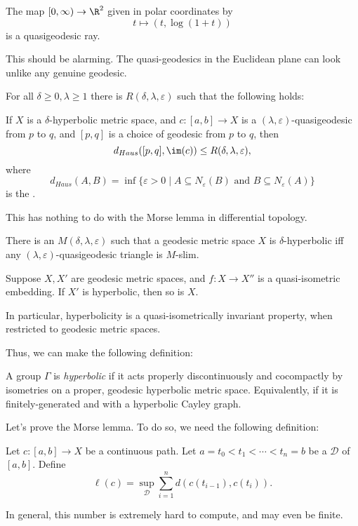 \documentclass[a4paper]{article}
\begin{document}
\begin{eg}
  The map $[0, \infty) \to \R^2$ given in polar coordinates by
  \[
    t \mapsto (t, \log(1 + t))
  \]
  is a quasigeodesic ray.
\end{eg}
This should be alarming. The quasi-geodesics in the Euclidean plane can look unlike any genuine geodesic.

\begin{thm}
  For all $\delta \geq 0, \lambda \geq 1$ there is $R(\delta, \lambda, \varepsilon)$ such that the following holds:
  
  If $X$ is a $\delta$-hyperbolic metric space, and $c: [a, b] \to X$ is a $(\lambda, \varepsilon)$-quasigeodesic from $p$ to $q$, and $[p, q]$ is a choice of geodesic from $p$ to $q$, then
  \[
    d_{Haus}([p, q], \im(c)) \leq R(\delta, \lambda, \varepsilon),
  \]
  where
  \[
    d_{Haus}(A, B) = \inf\{\varepsilon > 0 \mid A \subseteq N_\varepsilon(B) \text{ and }B \subseteq N_\varepsilon(A)\}
  \]
  is the .
\end{thm}
This has nothing to do with the Morse lemma in differential topology.

\begin{cor}
  There is an $M(\delta, \lambda, \varepsilon)$ such that a geodesic metric space $X$ is $\delta$-hyperbolic iff any $(\lambda, \varepsilon)$-quasigeodesic triangle is $M$-slim.
\end{cor}

\begin{cor}
  Suppose $X, X'$ are geodesic metric spaces, and $f: X \to X''$ is a quasi-isometric embedding. If $X'$ is hyperbolic, then so is $X$.

  In particular, hyperbolicity is a quasi-isometrically invariant property, when restricted to geodesic metric spaces.
\end{cor}

Thus, we can make the following definition:
\begin{defi}
  A  group $\Gamma$ is \emph{hyperbolic} if it acts properly discontinuously and cocompactly by isometries on a proper, geodesic hyperbolic metric space. Equivalently, if it is finitely-generated and with a hyperbolic Cayley graph.
\end{defi}

Let's prove the Morse lemma. To do so, we need the following definition:
\begin{defi}
  Let $c: [a, b] \to X$ be a continuous path. Let $a = t_0 < t_1 < \cdots < t_n = b$ be a  $\mathcal{D}$ of $[a, b]$. Define
  \[
    \ell (c) = \sup_{\mathcal{D}} \sum_{i = 1}^n d(c(t_{i - 1}), c(t_i)).
  \]
\end{defi}
In general, this number is extremely hard to compute, and may even be finite.
\end{document}
